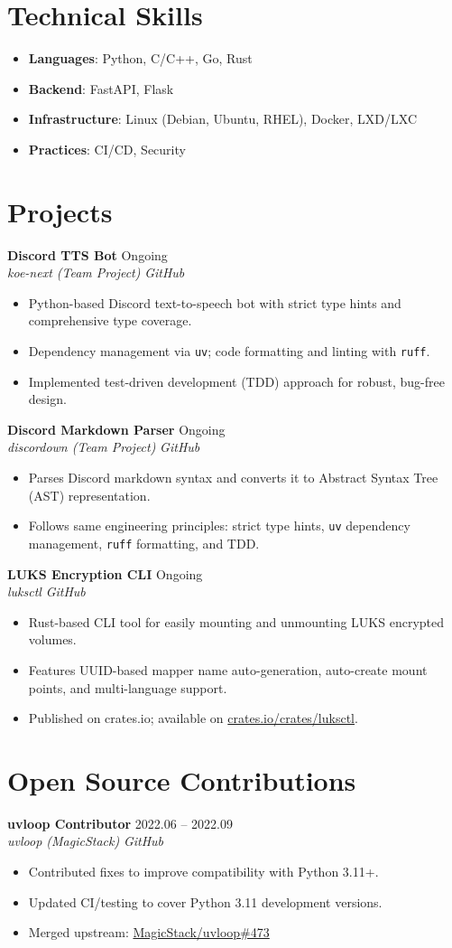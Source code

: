\documentclass[11pt,a4paper]{article}
\newcommand{\cventry}[5]{%
  \textbf{#1} \hfill {\small #4}\\
  \textit{#2} \hfill \textit{\small #3}\\
  \vspace{-4pt}
  \begin{itemize}[topsep=2pt,itemsep=2pt]
    #5
  \end{itemize}
  \vspace{2pt}
}
\begin{document}
\section*{Technical Skills}
\begin{itemize}[topsep=0pt,itemsep=1pt]
  \item \textbf{Languages}: Python, C/C++, Go, Rust
  \item \textbf{Backend}: FastAPI, Flask
  \item \textbf{Infrastructure}: Linux (Debian, Ubuntu, RHEL), Docker, LXD/LXC
  \item \textbf{Practices}: CI/CD, Security
\end{itemize}

\section*{Projects}
\cventry{Discord TTS Bot}{koe-next (Team Project)}{GitHub}{Ongoing}{
  \item Python-based Discord text-to-speech bot with strict type hints and comprehensive type coverage.
  \item Dependency management via \texttt{uv}; code formatting and linting with \texttt{ruff}.
  \item Implemented test-driven development (TDD) approach for robust, bug-free design.
}
\cventry{Discord Markdown Parser}{discordown (Team Project)}{GitHub}{Ongoing}{
  \item Parses Discord markdown syntax and converts it to Abstract Syntax Tree (AST) representation.
  \item Follows same engineering principles: strict type hints, \texttt{uv} dependency management, \texttt{ruff} formatting, and TDD.
}
\cventry{LUKS Encryption CLI}{luksctl}{GitHub}{Ongoing}{
  \item Rust-based CLI tool for easily mounting and unmounting LUKS encrypted volumes.
  \item Features UUID-based mapper name auto-generation, auto-create mount points, and multi-language support.
  \item Published on crates.io; available on \href{https://crates.io/crates/luksctl}{crates.io/crates/luksctl}.
}

\section*{Open Source Contributions}
\cventry{uvloop Contributor}{uvloop (MagicStack)}{GitHub}{2022.06 -- 2022.09}{
  \item Contributed fixes to improve compatibility with Python 3.11+.
  \item Updated CI/testing to cover Python 3.11 development versions.
  \item Merged upstream: \href{https://github.com/MagicStack/uvloop/pull/473}{MagicStack/uvloop\#473}
}
\end{document}
